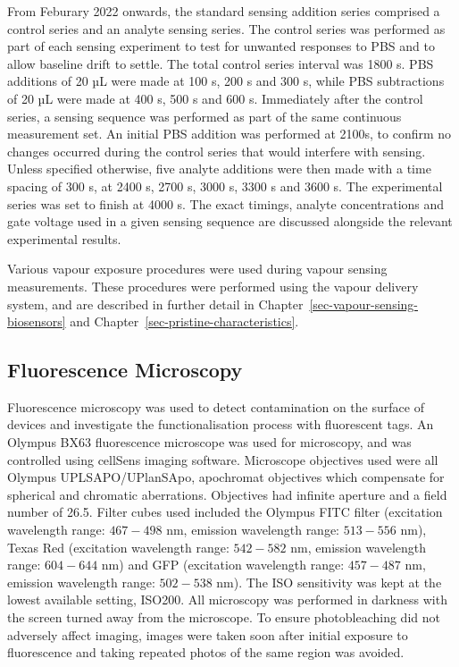 \documentclass[
  a4paper,
]{scrbook}
\begin{document}
From Feburary 2022 onwards, the standard sensing addition series
comprised a control series and an analyte sensing series. The control
series was performed as part of each sensing experiment to test for
unwanted responses to PBS and to allow baseline drift to settle. The
total control series interval was 1800 s. PBS additions of 20 µL were
made at 100 s, 200 s and 300 s, while PBS subtractions of 20 µL were
made at 400 s, 500 s and 600 s. Immediately after the control series, a
sensing sequence was performed as part of the same continuous
measurement set. An initial PBS addition was performed at 2100s, to
confirm no changes occurred during the control series that would
interfere with sensing. Unless specified otherwise, five analyte
additions were then made with a time spacing of 300 s, at 2400 s, 2700
s, 3000 s, 3300 s and 3600 s. The experimental series was set to finish
at 4000 s. The exact timings, analyte concentrations and gate voltage
used in a given sensing sequence are discussed alongside the relevant
experimental results.

Various vapour exposure procedures were used during vapour sensing
measurements. These procedures were performed using the vapour delivery
system, and are described in further detail in
Chapter~\ref{sec-vapour-sensing-biosensors} and
Chapter~\ref{sec-pristine-characteristics}.

\hypertarget{sec-fluorescence-characterisation}{%
\subsection{Fluorescence
Microscopy}\label{sec-fluorescence-characterisation}}

Fluorescence microscopy was used to detect contamination on the surface
of devices and investigate the functionalisation process with
fluorescent tags. An Olympus BX63 fluorescence microscope was used for
microscopy, and was controlled using cellSens imaging software.
Microscope objectives used were all Olympus UPLSAPO/UPlanSApo,
apochromat objectives which compensate for spherical and chromatic
aberrations. Objectives had infinite aperture and a field number of
26.5. Filter cubes used included the Olympus FITC filter (excitation
wavelength range: \(467-498\) nm, emission wavelength range: \(513-556\)
nm), Texas Red (excitation wavelength range: \(542-582\) nm, emission
wavelength range: \(604-644\) nm) and GFP (excitation wavelength range:
\(457-487\) nm, emission wavelength range: \(502-538\) nm). The ISO
sensitivity was kept at the lowest available setting, ISO200. All
microscopy was performed in darkness with the screen turned away from
the microscope. To ensure photobleaching did not adversely affect
imaging, images were taken soon after initial exposure to fluorescence
and taking repeated photos of the same region was avoided.
\end{document}
